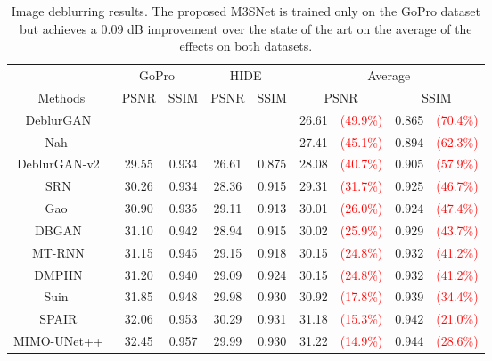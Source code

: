 \documentclass[sn-mathphys,Numbered]{sn-jnl}
\theoremstyle{thmstyleone}\newtheorem{theorem}{Theorem}\newtheorem{proposition}[theorem]{Proposition}
\theoremstyle{thmstyletwo}\newtheorem{example}{Example}\newtheorem{remark}{Remark}
\theoremstyle{thmstylethree}\newtheorem{definition}{Definition}
\begin{document}
\begin{table}[ht]
\caption{Image deblurring results. The proposed M3SNet is trained only on the GoPro dataset but achieves a 0.09 dB improvement over the state of the art on the average of the effects on both datasets. \label{tb:02}}

\begin{tabular}{ccccc||cccc}
    \hline
    \multicolumn{1}{c}{} & \multicolumn{2}{c}{GoPro~\cite{Gopro}}  & \multicolumn{2}{c||}{HIDE~\cite{HIDE}} & \multicolumn{4}{c}{Average}
    \\
   Methods & PSNR  & SSIM  & PSNR  & SSIM    & \multicolumn{2}{c}{ PSNR } & \multicolumn{2}{c}{ SSIM } 
    \\
    \hline\hline
    DeblurGAN~\cite{Degan}  &  &  &  & & 26.61 &\textcolor{red}{(49.9\%)} &0.865 &\textcolor{red}{(70.4\%)}
    \\
    Nah ~\cite{Gopro} &  &  &  & & 27.41  &\textcolor{red}{(45.1\%)}  &0.894&\textcolor{red}{(62.3\%)}
    \\
    DeblurGAN-v2~\cite{deganv2} & 29.55 & 0.934 & 26.61 & 0.875& 28.08  &\textcolor{red}{(40.7\%)} &0.905&\textcolor{red}{(57.9\%)}
    \\
    SRN~\cite{2018Scale} & 30.26 & 0.934 & 28.36 & 0.915 &29.31  &\textcolor{red}{(31.7\%)} &0.925&\textcolor{red}{(46.7\%)}
    \\
    Gao ~\cite{Gao2019DynamicSD} & 30.90 & 0.935 & 29.11 & 0.913 &30.01  &\textcolor{red}{(26.0\%)} &0.924&\textcolor{red}{(47.4\%)}
    \\
    DBGAN~\cite{DBGAN} & 31.10 & 0.942 & 28.94 & 0.915 &30.02 &\textcolor{red}{(25.9\%)} &0.929&\textcolor{red}{(43.7\%)}
    \\
    MT-RNN~\cite{MTRNN} & 31.15 & 0.945 & 29.15 & 0.918 &30.15  &\textcolor{red}{(24.8\%)}&0.932&\textcolor{red}{(41.2\%)}
    \\
    DMPHN~\cite{Zhang_2019_CVPR} & 31.20 & 0.940 & 29.09 & 0.924 & 30.15  &\textcolor{red}{(24.8\%)}&0.932&\textcolor{red}{(41.2\%)}
    \\
    Suin ~\cite{Suin2020SpatiallyAttentivePN} & 31.85 & 0.948 & 29.98 & 0.930&30.92 &\textcolor{red}{(17.8\%)}&0.939&\textcolor{red}{(34.4\%)}
    \\
    SPAIR~\cite{SPAIR} & 32.06 & 0.953 & 30.29 & 0.931 &31.18  &\textcolor{red}{(15.3\%)}&0.942&\textcolor{red}{(21.0\%)}
    \\
    MIMO-UNet++~\cite{2021Rethinking} & 32.45 & 0.957 & 29.99 & 0.930 &31.22  &\textcolor{red}{(14.9\%)}&0.944&\textcolor{red}{(28.6\%)}
    \\

\end{tabular}
\end{table}
\end{document}
